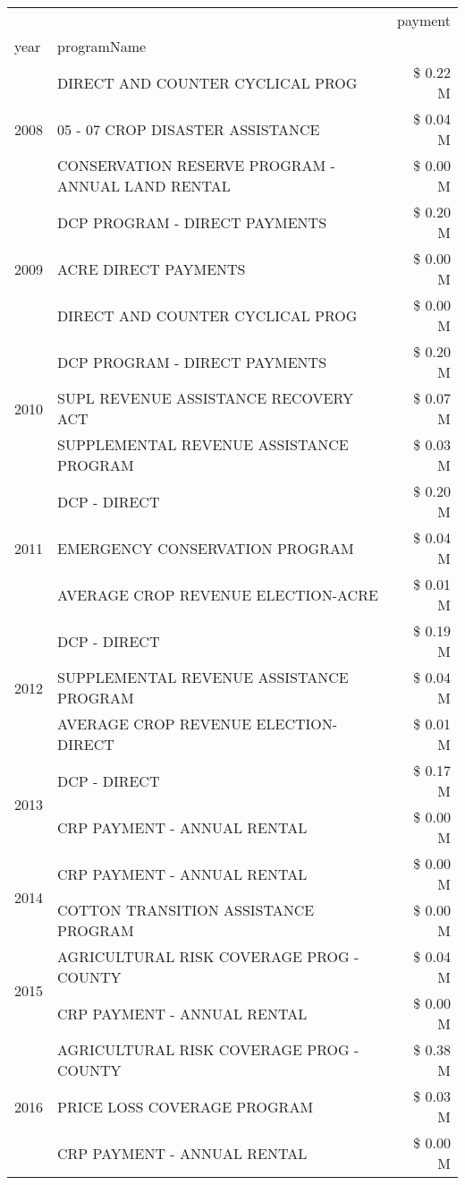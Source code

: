 \begin{tabular}{llr}
\toprule
 &  & payment \\
year & programName &  \\
\midrule
\multirow[t]{3}{*}{2008} & DIRECT AND COUNTER CYCLICAL PROG & \$ 0.22 M \\
 & 05 - 07 CROP DISASTER ASSISTANCE & \$ 0.04 M \\
 & CONSERVATION RESERVE PROGRAM - ANNUAL LAND RENTAL & \$ 0.00 M \\
\cline{1-3}
\multirow[t]{3}{*}{2009} & DCP PROGRAM - DIRECT PAYMENTS & \$ 0.20 M \\
 & ACRE DIRECT PAYMENTS & \$ 0.00 M \\
 & DIRECT AND COUNTER CYCLICAL PROG & \$ 0.00 M \\
\cline{1-3}
\multirow[t]{3}{*}{2010} & DCP PROGRAM - DIRECT PAYMENTS & \$ 0.20 M \\
 & SUPL REVENUE ASSISTANCE RECOVERY ACT & \$ 0.07 M \\
 & SUPPLEMENTAL REVENUE ASSISTANCE PROGRAM & \$ 0.03 M \\
\cline{1-3}
\multirow[t]{3}{*}{2011} & DCP - DIRECT & \$ 0.20 M \\
 & EMERGENCY CONSERVATION PROGRAM & \$ 0.04 M \\
 & AVERAGE CROP REVENUE ELECTION-ACRE & \$ 0.01 M \\
\cline{1-3}
\multirow[t]{3}{*}{2012} & DCP - DIRECT & \$ 0.19 M \\
 & SUPPLEMENTAL REVENUE ASSISTANCE PROGRAM & \$ 0.04 M \\
 & AVERAGE CROP REVENUE ELECTION-DIRECT & \$ 0.01 M \\
\cline{1-3}
\multirow[t]{2}{*}{2013} & DCP - DIRECT & \$ 0.17 M \\
 & CRP PAYMENT - ANNUAL RENTAL & \$ 0.00 M \\
\cline{1-3}
\multirow[t]{2}{*}{2014} & CRP PAYMENT - ANNUAL RENTAL & \$ 0.00 M \\
 & COTTON TRANSITION ASSISTANCE PROGRAM & \$ 0.00 M \\
\cline{1-3}
\multirow[t]{2}{*}{2015} & AGRICULTURAL RISK COVERAGE PROG - COUNTY & \$ 0.04 M \\
 & CRP PAYMENT - ANNUAL RENTAL & \$ 0.00 M \\
\cline{1-3}
\multirow[t]{3}{*}{2016} & AGRICULTURAL RISK COVERAGE PROG - COUNTY & \$ 0.38 M \\
 & PRICE LOSS COVERAGE PROGRAM & \$ 0.03 M \\
 & CRP PAYMENT - ANNUAL RENTAL & \$ 0.00 M \\

\end{tabular}
